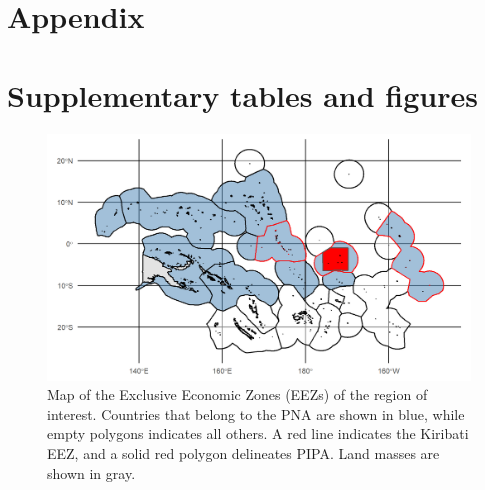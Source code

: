 \documentclass[9p,twocolumn,twoside,lineno]{pnas-new}
\begin{document}
\clearpage

\onecolumn

\FloatBarrier

\section{Appendix}\label{appendix}



\newcommand{\beginsupplement}{\setcounter{table}{0}  \renewcommand{\thetable}{S\arabic{table}} \setcounter{figure}{0} \renewcommand{\thefigure}{S\arabic{figure}}}

\setcounter{table}{0}  \renewcommand{\thetable}{S\arabic{table}} \setcounter{figure}{0} \renewcommand{\thefigure}{S\arabic{figure}}

\section{Supplementary tables and figures}



\clearpage



\clearpage



\begin{figure}
\centering
\includegraphics{img/PNA_map.png}
\caption{\label{fig:PNA_map}Map of the Exclusive Economic Zones (EEZs) of the region of interest. Countries that belong to the PNA are shown in blue, while empty polygons indicates all others. A red line indicates the Kiribati EEZ, and a solid red polygon delineates PIPA. Land masses are shown in gray.}
\end{figure}

\clearpage
\end{document}
